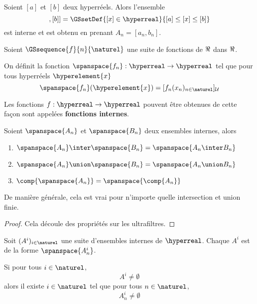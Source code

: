 \documentclass[a4paper, 12pt]{report}
\begin{document}
\begin{exemple}
	Soient $[a]$ et $[b]$ deux hyperréels. Alors l'ensemble
	\begin{equation}
		[ [a], [b] ] = \GSsetDef{[x] \in \hyperreal}{[a] \leq [x] \leq [b]}
	\end{equation}
	est interne et est obtenu en prenant $A_{n} = [a_{n}, b_{n}]$.
\end{exemple}

\begin{definition} 
	Soient $\GSsequence{f}{n}{\naturel}$ une suite de fonctions de $\real$ dans
	$\real$.

	On définit la fonction $\spanspace{f_{n}} : \hyperreal \rightarrow
	\hyperreal$ tel que pour tous hyperréels $\hyperelement{x}$
	\begin{equation}
		\spanspace{f_{n}}(\hyperelement{x}) = [f_{n}(x_{n})_{n \in
		\naturel}]_{\mathcal{U}}
	\end{equation}

	Les fonctions $f : \hyperreal \rightarrow \hyperreal$ pouvent être obtenues
	de cette façon sont appelées \textbf{fonctions internes}.
\end{definition}

\begin{proposition}
	Soient $\spanspace{A_{n}}$ et $\spanspace{B_{n}}$ deux ensembles internes,
	alors
	\begin{enumerate}
		\item $\spanspace{A_{n}} \inter \spanspace{B_{n}} = \spanspace{A_{n}
			\inter B_{n}}$
		\item $\spanspace{A_{n}} \union \spanspace{B_{n}} = \spanspace{A_{n}
			\union B_{n}}$
		\item $\comp{\spanspace{A_{n}}} = \spanspace{\comp{A_{n}}}$
	\end{enumerate}

	De manière générale, cela est vrai pour n'importe quelle intersection et
	union finie.
\end{proposition}

\ifdefined\outputproof
\begin{proof}
	Cela découle des propriétés sur les ultrafiltres.
\end{proof}
\fi

\begin{proposition}
	Soit $(A^{i})_{i \in \naturel}$ une suite d'ensembles internes de
	$\hyperreal$.
	Chaque $A^{i}$ est de la forme $\spanspace{A^{i}_{n}}$.

	Si pour tous $i \in \naturel$,
	\begin{equation}
		A^{i} \neq \emptyset
	\end{equation}
	alors il existe $i \in \naturel$ tel que pour tous $n \in \naturel$,
	\begin{equation}
		A^{i}_{n} \neq \emptyset
	\end{equation}
\end{proposition}
\end{document}
